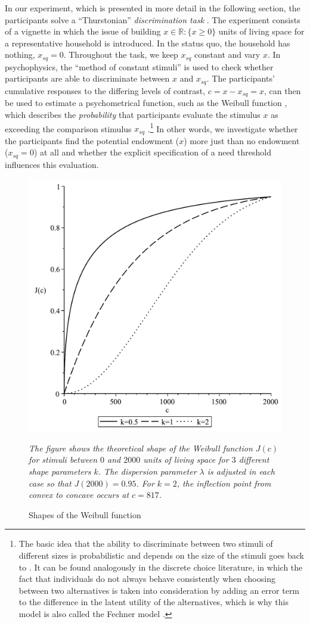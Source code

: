 \documentclass[12pt]{scrartcl}
\begin{document}
In our experiment, which is presented in more detail in the following section, the participants solve a ``Thurstonian'' \textit{discrimination task} \citep[pp.~101--104]{marks_psychophysical_2002}.
The experiment consists of a vignette in which the issue of building $x\in\mathbb{R}:\{x\ge0\}$ units of living space for a representative household is introduced.
In the status quo, the household has nothing, $x_{sq}=0$.
Throughout the task, we keep $x_{sq}$ constant and vary $x$.
In psychophysics, the ``method of constant stimuli'' is used to check whether participants are able to discriminate between $x$ and $x_{sq}$.
The participants' cumulative responses to the differing levels of contrast, $c=x-x_{sq}=x$, can then be used to estimate a psychometrical function, such as the Weibull function \citep{wichmann_psychometric_2001,mortensen_additive_2002}, which describes the \textit{probability} that participants evaluate the stimulus $x$ as exceeding the comparison stimulus $x_{sq}$ \citep[p.~2503]{treutwein_adaptive_1995}.\footnote{The basic idea that the ability to discriminate between two stimuli of different sizes is probabilistic and depends on the size of the stimuli goes back to \citet{fechner_elemente_1860}. It can be found analogously in the discrete choice literature, in which the fact that individuals do not always behave consistently when choosing between two alternatives is taken into consideration by adding an error term to the difference in the latent utility of the alternatives, which is why this model is also called the Fechner model \citep[see, e.\,g.,][]{blavatskyy_fechner_2018}.}
In other words, we investigate whether the participants find the potential endowment ($x$) more just than no endowment ($x_{sq}=0$) at all and whether the explicit specification of a need threshold influences this evaluation.

\begin{figure}[h!t!]
   \centering
   \includegraphics[width=0.5\linewidth]{figures/figure_1.pdf}
   \begin{minipage}{\linewidth}
   \footnotesize
   \textit{The figure shows the theoretical shape of the Weibull function $J(c)$ for stimuli between $0$ and $2000$ units of living space for $3$ different shape parameters $k$. The dispersion parameter $\lambda$ is adjusted in each case so that $J(2000)=0.95$. For $k=2$, the inflection point from convex to concave occurs at $c=817$.}
   \end{minipage}
   \caption{Shapes of the Weibull function}
   \label{fig:figure_1}
\end{figure}
\end{document}
